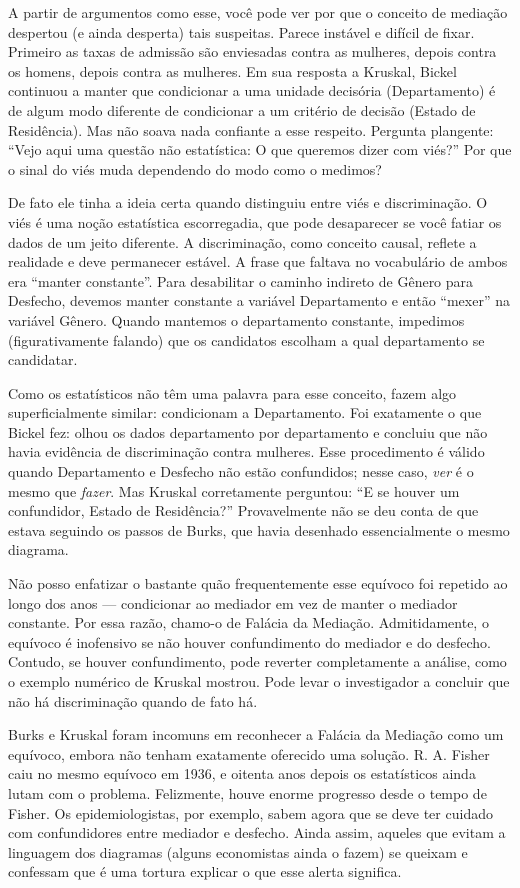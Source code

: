 \documentclass[11pt,a5paper,twoside]{book}
\begin{document}
A partir de argumentos como esse, você pode ver por que o conceito de mediação despertou (e ainda desperta) tais suspeitas. Parece instável e difícil de fixar. Primeiro as taxas de admissão são enviesadas contra as mulheres, depois contra os homens, depois contra as mulheres. Em sua resposta a Kruskal, Bickel continuou a manter que condicionar a uma unidade decisória (Departamento) é de algum modo diferente de condicionar a um critério de decisão (Estado de Residência). Mas não soava nada confiante a esse respeito. Pergunta plangente: “Vejo aqui uma questão não estatística: O que queremos dizer com viés?” Por que o sinal do viés muda dependendo do modo como o medimos?

De fato ele tinha a ideia certa quando distinguiu entre viés e discriminação. O viés é uma noção estatística escorregadia, que pode desaparecer se você fatiar os dados de um jeito diferente. A discriminação, como conceito causal, reflete a realidade e deve permanecer estável. A frase que faltava no vocabulário de ambos era “manter constante”. Para desabilitar o caminho indireto de Gênero para Desfecho, devemos manter constante a variável Departamento e então “mexer” na variável Gênero. Quando mantemos o departamento constante, impedimos (figurativamente falando) que os candidatos escolham a qual departamento se candidatar.

Como os estatísticos não têm uma palavra para esse conceito, fazem algo superficialmente similar: condicionam a Departamento. Foi exatamente o que Bickel fez: olhou os dados departamento por departamento e concluiu que não havia evidência de discriminação contra mulheres. Esse procedimento é válido quando Departamento e Desfecho não estão confundidos; nesse caso, \textit{ver} é o mesmo que \textit{fazer}. Mas Kruskal corretamente perguntou: “E se houver um confundidor, Estado de Residência?” Provavelmente não se deu conta de que estava seguindo os passos de Burks, que havia desenhado essencialmente o mesmo diagrama.

Não posso enfatizar o bastante quão frequentemente esse equívoco foi repetido ao longo dos anos — condicionar ao mediador em vez de manter o mediador constante. Por essa razão, chamo-o de Falácia da Mediação. Admitidamente, o equívoco é inofensivo se não houver confundimento do mediador e do desfecho. Contudo, se houver confundimento, pode reverter completamente a análise, como o exemplo numérico de Kruskal mostrou. Pode levar o investigador a concluir que não há discriminação quando de fato há.

Burks e Kruskal foram incomuns em reconhecer a Falácia da Mediação como um equívoco, embora não tenham exatamente oferecido uma solução. R. A. Fisher caiu no mesmo equívoco em 1936, e oitenta anos depois os estatísticos ainda lutam com o problema. Felizmente, houve enorme progresso desde o tempo de Fisher. Os epidemiologistas, por exemplo, sabem agora que se deve ter cuidado com confundidores entre mediador e desfecho. Ainda assim, aqueles que evitam a linguagem dos diagramas (alguns economistas ainda o fazem) se queixam e confessam que é uma tortura explicar o que esse alerta significa.
\end{document}
